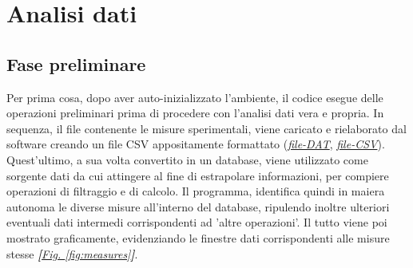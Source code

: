 \documentclass[a4paper,10pt]{article}                                                                                       %
\begin{document}
\section{Analisi dati}                                                                                                      %
\label{sec:data_analysis}                                                                                                   %
\subsection{Fase preliminare}                                                                                               %
\label{subsec:prelim_phase}                                                                                                 %
  Per prima cosa, dopo aver auto-inizializzato l'ambiente, il codice esegue delle operazioni preliminari prima di
  procedere con l'analisi dati vera e propria. In sequenza, il file contenente le misure sperimentali, viene caricato e
  rielaborato dal software creando un file CSV appositamente formattato
  (\textit{\href{https://github.com/CristianMerli/DataAnalysis/blob/master/data_analysis/dataset/scambiatore26112021_5.dat}{file-DAT}},
  \textit{\href{https://github.com/CristianMerli/DataAnalysis/blob/master/data_analysis/dataset/scambiatore26112021_5.csv}{file-CSV}}).
  Quest'ultimo, a sua volta convertito in un database, viene utilizzato come sorgente dati da cui attingere al fine di
  estrapolare informazioni, per compiere operazioni di filtraggio e di calcolo. Il programma, identifica quindi in maiera
  autonoma le diverse misure all'interno del database, ripulendo inoltre ulteriori eventuali dati intermedi corrispondenti
  ad 'altre operazioni'. Il tutto viene poi mostrato graficamente, evidenziando le finestre dati corrispondenti alle
  misure stesse \textit{\textbf{[}\hyperref[fig:measures]{Fig. }\ref{fig:measures}\textbf{]}}.
\end{document}
